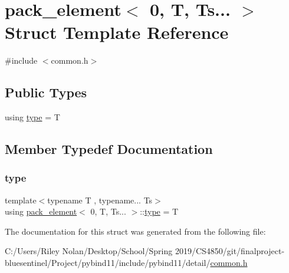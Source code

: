 \hypertarget{structpack__element_3_010_00_01_t_00_01_ts_8_8_8_01_4}{}\section{pack\+\_\+element$<$ 0, T, Ts... $>$ Struct Template Reference}
\label{structpack__element_3_010_00_01_t_00_01_ts_8_8_8_01_4}


{\ttfamily \#include $<$common.\+h$>$}

\subsection*{Public Types}
\begin{DoxyCompactItemize}
\item 
using \mbox{\hyperlink{structpack__element_3_010_00_01_t_00_01_ts_8_8_8_01_4_af446bf84374bd0377d1d3e8178a7a62a}{type}} = T
\end{DoxyCompactItemize}


\subsection{Member Typedef Documentation}
\mbox{\label{structpack__element_3_010_00_01_t_00_01_ts_8_8_8_01_4_af446bf84374bd0377d1d3e8178a7a62a}} 
\subsubsection{\texorpdfstring{type}{type}}
{\footnotesize\ttfamily template$<$typename T , typename... Ts$>$ \\
using \mbox{\hyperlink{structpack__element}{pack\+\_\+element}}$<$ 0, T, Ts... $>$\+::\mbox{\hyperlink{structpack__element_3_010_00_01_t_00_01_ts_8_8_8_01_4_af446bf84374bd0377d1d3e8178a7a62a}{type}} =  T}



The documentation for this struct was generated from the following file\+:\begin{DoxyCompactItemize}
\item 
C\+:/\+Users/\+Riley Nolan/\+Desktop/\+School/\+Spring 2019/\+C\+S4850/git/finalproject-\/bluesentinel/\+Project/pybind11/include/pybind11/detail/\mbox{\hyperlink{detail_2common_8h}{common.\+h}}\end{DoxyCompactItemize}
